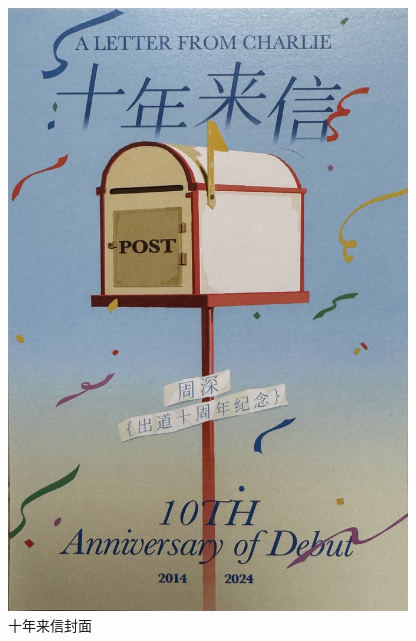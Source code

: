\documentclass[]{ctexbook}
\begin{document}
\begin{figure}

{\centering \includegraphics[width=300pt]{img/letter-cover} 

}

\caption{十年来信封面}\label{fig:unnamed-chunk-186}
\end{figure}

\newpage
\end{document}
